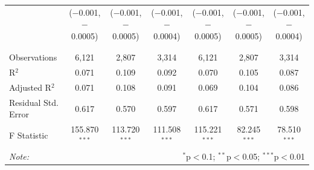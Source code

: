 \documentclass[alpha-refs]{wiley-article-01g}
\begin{document}
\begin{landscape}
\begin{table}[!htbp]
\begin{tabular}{@{\extracolsep{5pt}}lcccccc}
			& ($-$0.001, $-$0.0005) & ($-$0.001, $-$0.0005) & ($-$0.001, $-$0.0004) & ($-$0.001, $-$0.0005) & ($-$0.001, $-$0.0005) & ($-$0.001, $-$0.0004) \\ 
			& & & & & & \\ 
			\hline \\[-.8ex] 
			Observations & 6,121 & 2,807 & 3,314 & 6,121 & 2,807 & 3,314 \\ 
			R$^{2}$ & 0.071 & 0.109 & 0.092 & 0.070 & 0.105 & 0.087 \\ 
			Adjusted R$^{2}$ & 0.071 & 0.108 & 0.091 & 0.069 & 0.104 & 0.086 \\ 
			Residual Std. Error & 0.617 & 0.570 & 0.597 & 0.617 & 0.571 & 0.598 \\ 
			F Statistic & 155.870$^{***}$ & 113.720$^{***}$ & 111.508$^{***}$ & 115.221$^{***}$ & 82.245$^{***}$ & 78.510$^{***}$ \\ 
			\hline 
			\textit{Note:}  & \multicolumn{6}{r}{$^{*}$p$<$0.1; $^{**}$p$<$0.05; $^{***}$p$<$0.01} \\ 
		\end{tabular} 
	\end{table} 
	
\end{landscape}

\newpage
\end{document}
